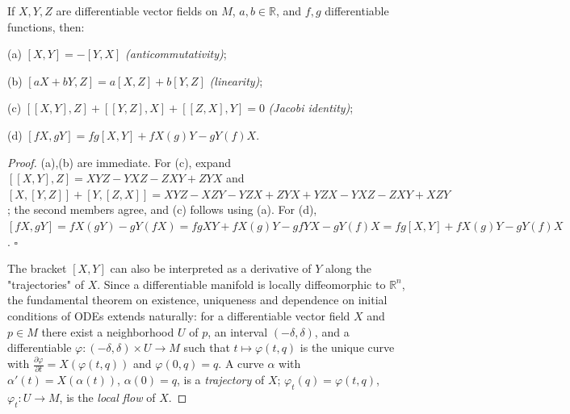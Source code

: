 \begin{proposition}
  \label{prop:dc-ch0-5-3}
  \leanok
  If $X,Y,Z$ are differentiable vector fields on $M$, $a,b\in\mathbb{R}$, and $f,g$
  differentiable functions, then:
  
  (a) $[X,Y]=-[Y,X]$ \emph{(anticommutativity)};
  
  (b) $[aX+bY,Z]=a[X,Z]+b[Y,Z]$ \emph{(linearity)};
  
  (c) $[[X,Y],Z]+[[Y,Z],X]+[[Z,X],Y]=0$ \emph{(Jacobi identity)};
  
  (d) $[fX,gY]=fg[X,Y]+fX(g)Y-gY(f)X$.
\end{proposition}
\begin{proof}
  (a),(b) are immediate. For (c), expand
  $[[X,Y],Z]=XYZ-YXZ-ZXY+ZYX$ and
  $[X,[Y,Z]]+[Y,[Z,X]]=XYZ-XZY-YZX+ZYX+YZX-YXZ-ZXY+XZY$; the second members
  agree, and (c) follows using (a). For (d),
  $[fX,gY]=fX(gY)-gY(fX)=fgXY+fX(g)Y-gfYX-gY(f)X=fg[X,Y]+fX(g)Y-gY(f)X$. $\square$
  
  The bracket $[X,Y]$ can also be interpreted as a derivative of $Y$ along the
  "trajectories" of $X$. Since a differentiable manifold is locally diffeomorphic
  to $\mathbb{R}^n$, the fundamental theorem on existence, uniqueness and dependence
  on initial conditions of ODEs extends naturally: for a differentiable vector
  field $X$ and $p\in M$ there exist a neighborhood $U$ of $p$, an interval
  $(-\delta,\delta)$, and a differentiable $\varphi:(-\delta,\delta)\times U\to M$
  such that $t\mapsto\varphi(t,q)$ is the unique curve with
  $\frac{\partial\varphi}{\partial t}=X(\varphi(t,q))$ and $\varphi(0,q)=q$. A curve
  $\alpha$ with $\alpha'(t)=X(\alpha(t))$, $\alpha(0)=q$, is a \emph{trajectory} of $X$;
  $\varphi_t(q)=\varphi(t,q)$, $\varphi_t:U\to M$, is the \emph{local flow} of $X$.
\end{proof}

